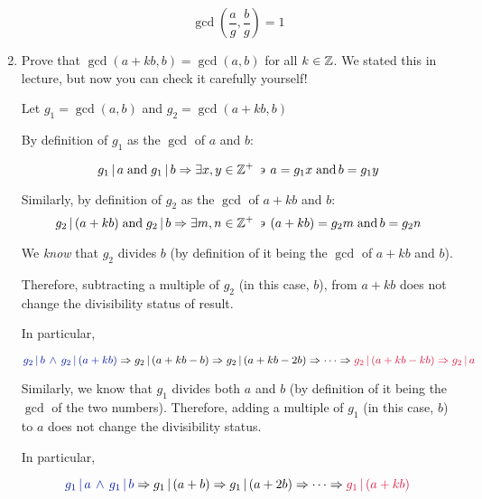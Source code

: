 \begin{problem}
\begin{enumerate}
\begin{Answer}
\begin{equation}
  \gcd(\frac{a}{g},\frac{b}{g})=1
\end{equation}
\end{Answer}
\newpage
\item Prove that $\gcd(a+kb,b)=\gcd(a,b)$ for all $k \in \mathbb{Z}$.
  We stated this in lecture, but now you can check it carefully
  yourself!

\noindent
\begin{Answer}
\setcounter{equation}{0}

Let $g_{1} = \gcd(a, b)$ and $g_{2} = \gcd(a+kb, b)$

By definition of $g_{1}$ as the $\gcd$ of $a$ and $b$:

\begin{equation}
g_{1}\, |\, a \;\text{and}\; g_{1}\, |\, b \Rightarrow \exists x, y \in \mathbb{Z}^{+} \, \backepsilon\, a = g_{1}x \;\text{and}\, b = g_{1}y
\end{equation}

Similarly, by definition of $g_{2}$ as the $\gcd$ of $a+kb$ and $b$:
\begin{equation}
g_{2}\, |\, (a+kb) \;\text{and}\; g_{2}\, |\, b \Rightarrow \exists m, n \in \mathbb{Z}^{+} \, \backepsilon\, (a+kb) = g_{2}m \;\text{and}\, b = g_{2}n
\end{equation}

We \textit{know} that $g_{2}$ divides $b$ (by definition of it being the $\gcd$ of $a+kb$ and $b$).

Therefore, subtracting a multiple of $g_{2}$ (in this case, $b$), from $a + kb$ does not change the divisibility status of result.

In particular,

\begin{equation}
  \zaff{g_{2}\, |\, b\, \land\, g_{2}\, |\, (a + kb)} \Rightarrow g_{2}\, |\, (a+kb-b) \Rightarrow g_{2}\, |\, (a+kb-2b) \Rightarrow \dots \Rightarrow \crim{g_{2}\,|\,(a + kb-kb) \Rightarrow g_{2}\,|\,a}
\end{equation}

Similarly, we know that $g_{1}$ divides both $a$ and $b$ (by definition of it being the $\gcd$ of the two numbers).
Therefore, adding a multiple of $g_1$ (in this case, $b$) to $a$ does not change the divisibility status.

In particular,

\begin{equation}
  \zaff{g_{1}\, |\, a\, \land\, g_{1}\, |\, b} \Rightarrow g_{1}\, |\, (a+b) \Rightarrow g_{1}\, |\, (a+2b) \Rightarrow \dots \Rightarrow \crim{g_{1}\,|\,(a + kb)}
\end{equation}


\end{Answer}
\end{enumerate}
\end{problem}
